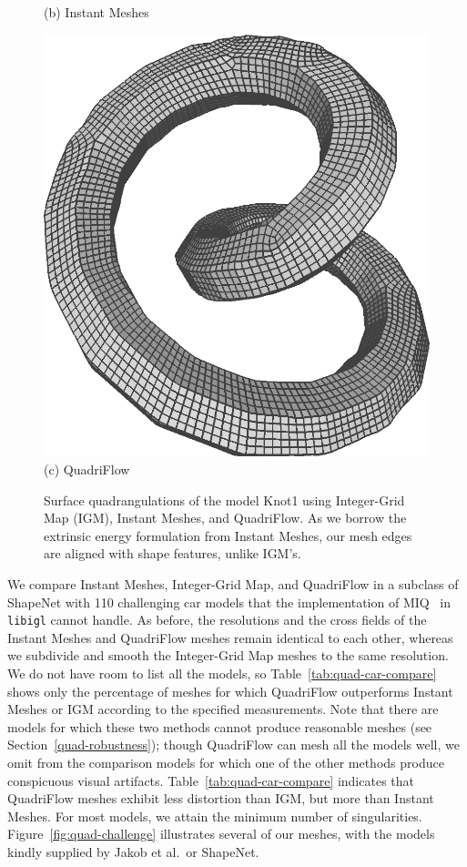 \begin{figure}
\begin{minipage}{0.25\linewidth}
(b) Instant Meshes
\end{minipage}
\begin{minipage}{0.25\linewidth}
\centering
\includegraphics[width=\linewidth]{quadriflow/result/feature03.png}\\
(c) QuadriFlow
\end{minipage}

\caption{Surface quadrangulations of the model Knot1 using Integer-Grid Map (IGM), Instant Meshes, and QuadriFlow. As we borrow the extrinsic energy formulation from Instant Meshes, our mesh edges are aligned with shape features, unlike IGM's.}
\label{fig:quad-shape-feature}
\end{figure}

We compare Instant Meshes, Integer-Grid Map, and QuadriFlow in a subclass of ShapeNet with 110 challenging car models that the implementation of MIQ~\cite{bommes2009mixed} in \texttt{libigl} cannot handle. As before, the resolutions and the cross fields of the Instant Meshes and QuadriFlow meshes remain identical to each other, whereas we subdivide and smooth the Integer-Grid Map meshes to the same resolution. We do not have room to list all the models, so Table~\ref{tab:quad-car-compare} shows only the percentage of meshes for which QuadriFlow outperforms Instant Meshes or IGM according to the specified measurements. Note that there are models for which these two methods cannot produce reasonable meshes (see Section~\ref{quad-robustness}); though QuadriFlow can mesh all the models well, we omit from the comparison models for which one of the other methods produce conspicuous visual artifacts. Table~\ref{tab:quad-car-compare} indicates that QuadriFlow meshes exhibit less distortion than IGM, but more than Instant Meshes. For most models, we attain the minimum number of singularities. Figure~\ref{fig:quad-challenge} illustrates several of our meshes, with the models kindly supplied by Jakob et al.\ or ShapeNet.

